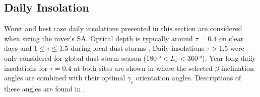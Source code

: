 \subsection{Daily Insolation}
Worst and best case daily insolations presented in this section are considered when sizing the rover's \ac{SA}. Optical depth is typically around $\tau = 0.4$ on clear days  and $1 \leq \tau \leq 1.5$ during local dust storms . Daily insolations $\tau > 1.5$ were only considered for global dust storm season ($\SI{180}{\degree} < L_{s} < \SI{360}{\degree}$). Year long daily insolations for $\tau = 0.4$ at both sites are shown in  where the selected $\beta$ inclination angles are combined with their optimal $\gamma_c$ orientation angles. Descriptions of these angles are found in .

